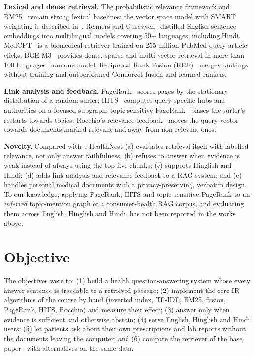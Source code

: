 \documentclass[conference]{IEEEtran}
\begin{document}
\textbf{Lexical and dense retrieval.} The probabilistic relevance framework and BM25~\cite{robertson2009} remain strong lexical baselines; the vector space model with SMART weighting is described in~\cite{manning2008}. Reimers and Gurevych~\cite{reimers2020} distilled English sentence embeddings into multilingual models covering 50+ languages, including Hindi. MedCPT~\cite{jin2023} is a biomedical retriever trained on 255 million PubMed query-article clicks. BGE-M3~\cite{chen2024} provides dense, sparse and multi-vector retrieval in more than 100 languages from one model. Reciprocal Rank Fusion (RRF)~\cite{cormack2009} merges rankings without training and outperformed Condorcet fusion and learned rankers.

\textbf{Link analysis and feedback.} PageRank~\cite{page1999} scores pages by the stationary distribution of a random surfer; HITS~\cite{kleinberg1999} computes query-specific hubs and authorities on a focused subgraph; topic-sensitive PageRank~\cite{haveliwala2002} biases the surfer's restarts towards topics. Rocchio's relevance feedback~\cite{rocchio1971} moves the query vector towards documents marked relevant and away from non-relevant ones.

\textbf{Novelty.} Compared with~\cite{fedallah2026}, HealthNest (a) evaluates retrieval itself with labelled relevance, not only answer faithfulness; (b) refuses to answer when evidence is weak instead of always using the top five chunks; (c) supports Hinglish and Hindi; (d) adds link analysis and relevance feedback to a RAG system; and (e) handles personal medical documents with a privacy-preserving, verbatim design. To our knowledge, applying PageRank, HITS and topic-sensitive PageRank to an \emph{inferred} topic-mention graph of a consumer-health RAG corpus, and evaluating them across English, Hinglish and Hindi, has not been reported in the works above.

\section{Objective}
The objectives were to: (1) build a health question-answering system whose every answer sentence is traceable to a retrieved passage; (2) implement the core IR algorithms of the course by hand (inverted index, TF-IDF, BM25, fusion, PageRank, HITS, Rocchio) and measure their effect; (3) answer only when evidence is sufficient and otherwise abstain; (4) serve English, Hinglish and Hindi users; (5) let patients ask about their own prescriptions and lab reports without the documents leaving the computer; and (6) compare the retriever of the base paper~\cite{fedallah2026} with alternatives on the same data.
\end{document}
